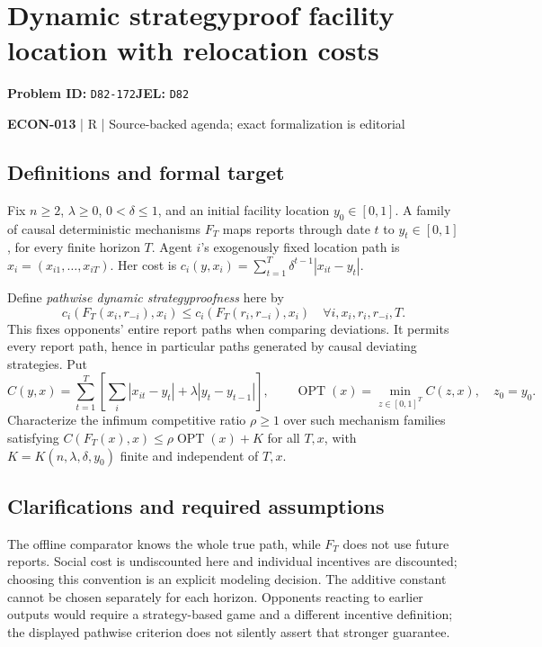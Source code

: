 \documentclass[11pt,a4paper]{article}
\begin{document}
\section*{Dynamic strategyproof facility location with relocation costs}
\textbf{Problem ID:} \texttt{D82-172}\quad \textbf{JEL:} \texttt{D82}\par
\label{problem:OP-0598}


\label{audited:ECON-013}

{\sffamily\small\color{muted}\textbf{ECON-013} | R | Source-backed agenda; exact formalization is editorial\par}

\subsection*{Definitions and formal target}

Fix $n\geq2$, $\lambda\geq0$, $0<\delta\leq1$, and an initial facility location $y_0\in[0,1]$. A family of causal deterministic mechanisms $F_T$ maps reports through date $t$ to $y_t\in[0,1]$, for every finite horizon $T$. Agent $i$'s exogenously fixed location path is $x_i=(x_{i1},\ldots,x_{iT})$. Her cost is $c_i(y,x_i)=\sum_{t=1}^T\delta^{t-1}|x_{it}-y_t|$.

Define \emph{pathwise dynamic strategyproofness} here by
\[
c_i(F_T(x_i,r_{-i}),x_i)\leq c_i(F_T(r_i,r_{-i}),x_i)
\quad\forall i,x_i,r_i,r_{-i},T.
\]
This fixes opponents' entire report paths when comparing deviations. It permits every report path, hence in particular paths generated by causal deviating strategies. Put
\[
C(y,x)=\sum_{t=1}^T\left[\sum_i|x_{it}-y_t|+\lambda|y_t-y_{t-1}|\right],\qquad
\operatorname{OPT}(x)=\min_{z\in[0,1]^T}C(z,x),\quad z_0=y_0.
\]
Characterize the infimum competitive ratio $\rho\geq1$ over such mechanism families satisfying $C(F_T(x),x)\leq\rho\operatorname{OPT}(x)+K$ for all $T,x$, with $K=K(n,\lambda,\delta,y_0)$ finite and independent of $T,x$.

\subsection*{Clarifications and required assumptions}

The offline comparator knows the whole true path, while $F_T$ does not use future reports. Social cost is undiscounted here and individual incentives are discounted; choosing this convention is an explicit modeling decision. The additive constant cannot be chosen separately for each horizon. Opponents reacting to earlier outputs would require a strategy-based game and a different incentive definition; the displayed pathwise criterion does not silently assert that stronger guarantee.
\end{document}
